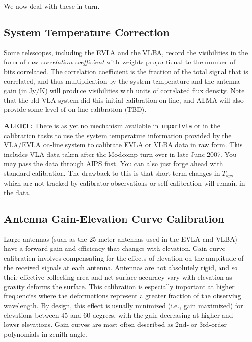 We now deal with these in turn.

\subsection{System Temperature Correction}
\label{section:cal.prior.tsys}

Some telescopes, including the EVLA and the VLBA, record the
visibilities in the form of raw {\it correlation coefficient} 
with weights proportional to the number of bits correlated.
The correlation coefficient is the fraction of the total signal
that is correlated, and thus multiplication by the system temperature
and the antenna gain (in Jy/K) will produce visibilities with
units of correlated flux density.  Note that the old VLA system did
this initial calibration on-line, and ALMA will also provide some
level of on-line calibration (TBD).

{\bf ALERT:} There is as yet no mechanism available in {\tt importvla}
or in the calibration tasks to use the system temperature information
provided by the VLA/EVLA on-line system to calibrate EVLA or VLBA data
in raw form.  This includes VLA data taken after the Modcomp turn-over
in late June 2007.  You may pass the data through AIPS first.  You can
also just forge ahead with standard calibration.  The drawback to this
is that short-term changes in $T_{sys}$ which are not tracked by
calibrator observations or self-calibration will remain in the data.

\subsection{Antenna Gain-Elevation Curve Calibration}
\label{section:cal.prior.curves}

Large antennas (such as the 25-meter antennas used
in the EVLA and VLBA) have a forward gain and efficiency that changes with
elevation. Gain curve calibration involves compensating for the effects of
elevation on the amplitude of the received signals at each antenna.
Antennas are not absolutely rigid, and so their effective collecting
area and net surface accuracy vary with elevation as gravity deforms
the surface.  This calibration is especially important at higher
frequencies where the deformations represent a greater fraction of the
observing wavelength.  By design, this effect is usually minimized
(i.e., gain maximized) for elevations between 45 and 60 degrees, with
the gain decreasing at higher and lower elevations.  Gain curves are
most often described as 2nd- or 3rd-order polynomials in zenith angle.

